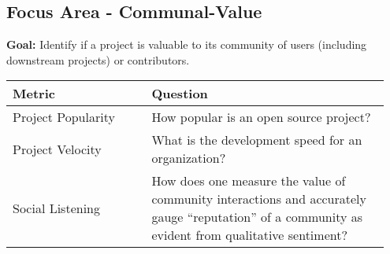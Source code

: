 
\subsection{Focus Area - Communal-Value}
\textbf{Goal:} Identify if a project is valuable to its community of users (including downstream projects) or contributors.
\begin{table}[ht!]
    \centering
    \begin{tabular}{|p{0.35\linewidth} | p{0.6\linewidth}|}
        \hline
        \hfil \textbf{Metric}  & \hfil \textbf{Question} \\
        \hline
		Project Popularity & How popular is an open source project? \\ 
		\hline
		Project Velocity & What is the development speed for an organization? \\ 
		\hline
		Social Listening & How does one measure the value of community interactions and accurately gauge “reputation” of a community as evident from qualitative sentiment? \\ 
		\hline
    \end{tabular}
\end{table}

 
 
 
